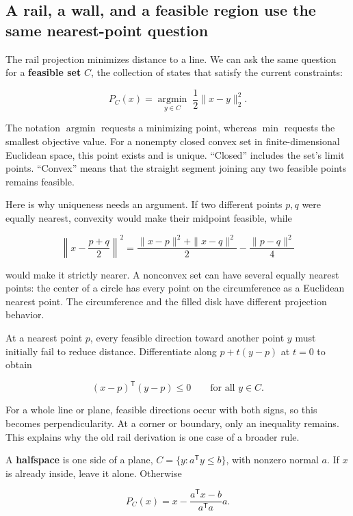 \subsection{A rail, a wall, and a feasible region use the same nearest-point question}\label{01-foundations-i-ch017-a-rail-a-wall-and-a-feasible-region-use-the-same-nearest-point-question}

The rail projection minimizes distance to a line. We can ask the same question for a \textbf{feasible set} \(C\), the collection of states that satisfy the current constraints:

\[
P_C(x)=\underset{y\in C}{\operatorname{argmin}}\;\frac12\|x-y\|_2^2.
\]

The notation \(\operatorname{argmin}\) requests a minimizing point, whereas \(\min\) requests the smallest objective value. For a nonempty closed convex set in finite-dimensional Euclidean space, this point exists and is unique. ``Closed'' includes the set's limit points. ``Convex'' means that the straight segment joining any two feasible points remains feasible.

Here is why uniqueness needs an argument. If two different points \(p,q\) were equally nearest, convexity would make their midpoint feasible, while

\[
\left\|x-\frac{p+q}{2}\right\|^2
=\frac{\|x-p\|^2+\|x-q\|^2}{2}-\frac{\|p-q\|^2}{4}
\]

would make it strictly nearer. A nonconvex set can have several equally nearest points: the center of a circle has every point on the circumference as a Euclidean nearest point. The circumference and the filled disk have different projection behavior.

At a nearest point \(p\), every feasible direction toward another point \(y\) must initially fail to reduce distance. Differentiate along \(p+t(y-p)\) at \(t=0\) to obtain

\[
(x-p)^{\mathsf T}(y-p)\le0\qquad\text{for all }y\in C.
\]

For a whole line or plane, feasible directions occur with both signs, so this becomes perpendicularity. At a corner or boundary, only an inequality remains. This explains why the old rail derivation is one case of a broader rule.

A \textbf{halfspace} is one side of a plane, \(C=\{y:a^{\mathsf T}y\le b\}\), with nonzero normal \(a\). If \(x\) is already inside, leave it alone. Otherwise

\[
P_C(x)=x-\frac{a^{\mathsf T}x-b}{a^{\mathsf T}a}a.
\]

